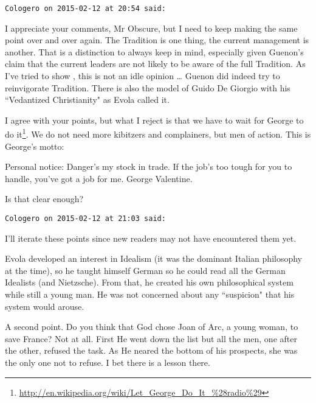 \begin{footnotesize}\begin{sffamily}



\texttt{Cologero on 2015-02-12 at 20:54 said: }

I appreciate your comments, Mr Obscure, but I need to keep making the same point over and over again. The Tradition is one thing, the current management is another. That is a distinction to always keep in mind, especially given Guenon's claim that the current leaders are not likely to be aware of the full Tradition. As I've tried to show , this is not an idle opinion … Guenon did indeed try to reinvigorate Tradition. There is also the model of Guido De Giorgio with his ``Vedantized Christianity" as Evola called it.

I agree with your points, but what I reject is that we have to wait for George to do it\footnote{\url{http://en.wikipedia.org/wiki/Let_George_Do_It_\%28radio\%29}}. We do not need more kibitzers and complainers, but men of action. This is George's motto:

\begin{quotex}\footnotesize
Personal notice: Danger's my stock in trade. If the job's too tough for you to handle, you've got a job for me. George Valentine. 

\end{quotex}
Is that clear enough?


\hfill

\texttt{Cologero on 2015-02-12 at 21:03 said: }

I'll iterate these points since new readers may not have encountered them yet.

Evola developed an interest in Idealism (it was the dominant Italian philosophy at the time), so he taught himself German so he could read all the German Idealists (and Nietzsche). From that, he created his own philosophical system while still a young man. He was not concerned about any ``suspicion" that his system would arouse.

A second point. Do you think that God chose Joan of Arc, a young woman, to save France? Not at all. First He went down the list but all the men, one after the other, refused the task. As He neared the bottom of his prospects, she was the only one not to refuse. I bet there is a lesson there.


\end{sffamily}\end{footnotesize}
